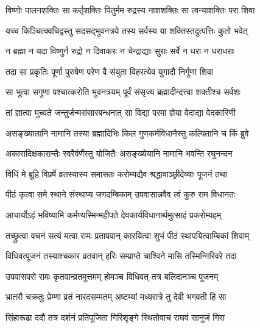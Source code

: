 \twolineshloka
{विष्णोः पालनशक्तिः सा कर्तृशक्तिः पितुर्मम}
{रुद्रस्य नाशशक्तिः सा त्वन्याशक्तिः परा शिवा}%

\twolineshloka
{यच्च किञ्चित्क्वचिद्वस्तु सदसद्‌भुवनत्रये}
{तस्य सर्वस्य या शक्तिस्तदुत्पत्तिः कुतो भवेत्}%

\twolineshloka
{न ब्रह्मा न यदा विष्णुर्न रुद्रो न दिवाकरः}
{न चेन्द्राद्याः सुराः सर्वे न धरा न धराधराः}%

\twolineshloka
{तदा सा प्रकृतिः पूर्णा पुरुषेण परेण वै}
{संयुता विहरत्येव युगादौ निर्गुणा शिवा}%

\twolineshloka
{सा भूत्वा सगुणा पश्चात्करोति भुवनत्रयम्}
{पूर्वं संसृज्य ब्रह्मादीन्दत्त्वा शक्तीश्च सर्वशः}%

\twolineshloka
{तां ज्ञात्वा मुच्यते जन्तुर्जन्मसंसारबन्धनात्}
{सा विद्या परमा ज्ञेया वेदाद्या वेदकारिणी}%

\twolineshloka
{असङ्ख्यातानि नामानि तस्या ब्रह्मादिभिः किल}
{गुणकर्मविधानैस्तु कल्पितानि च किं ब्रुवे}%

\twolineshloka
{अकारादिक्षकारान्तैः स्वरैर्वर्णैस्तु योजितैः}
{असङ्ख्येयानि नामानि भवन्ति रघुनन्दन}%




\twolineshloka
{विधिं मे ब्रूहि विप्रर्षे व्रतस्यास्य समासतः}
{करोम्यद्यैव श्रद्धावाञ्छ्रीदेव्याः पूजनं तथा}%



\twolineshloka
{पीठं कृत्वा समे स्थाने संस्थाप्य जगदम्बिकाम्}
{उपवासान्नवैव त्वं कुरु राम विधानतः}%

\twolineshloka
{आचार्योऽहं भविष्यामि कर्मण्यस्मिन्महीपते}
{देवकार्यविधानार्थमुत्साहं प्रकरोम्यहम्}%



\twolineshloka
{तच्छ्रुत्वा वचनं सत्यं मत्वा रामः प्रतापवान्}
{कारयित्वा शुभं पीठं स्थापयित्वाम्बिकां शिवाम्}%

\twolineshloka
{विधिवत्पूजनं तस्याश्चकार व्रतवान् हरिः}
{सम्प्राप्ते चाश्विने मासि तस्मिन्गिरिवरे तदा}%

\twolineshloka
{उपवासपरो रामः कृतवान्व्रतमुत्तमम्}
{होमञ्च विधिवत् तत्र बलिदानञ्च पूजनम्}%

\twolineshloka
{भ्रातरौ चक्रतुः प्रेम्णा व्रतं नारदसम्मतम्}
{अष्टम्यां मध्यरात्रे तु देवी भगवती हि सा}%

\twolineshloka
{सिंहारूढा ददौ तत्र दर्शनं प्रतिपूजिता}
{गिरिशृङ्गे स्थितोवाच राघवं सानुजं गिरा}%

